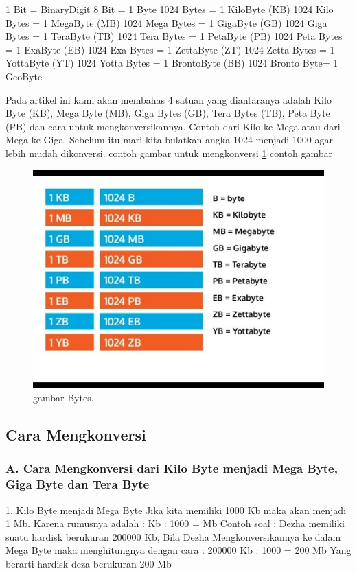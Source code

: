 1 Bit = BinaryDigit
8 Bit = 1 Byte
1024 Bytes = 1 KiloByte (KB)
1024 Kilo Bytes = 1 MegaByte (MB)
1024 Mega Bytes = 1 GigaByte (GB)
1024 Giga Bytes = 1 TeraByte (TB)
1024 Tera Bytes = 1 PetaByte (PB)
1024 Peta Bytes = 1 ExaByte (EB)
1024 Exa Bytes = 1 ZettaByte (ZT)
1024 Zetta Bytes = 1 YottaByte (YT)
1024 Yotta Bytes = 1 BrontoByte (BB)
1024 Bronto Byte= 1 GeoByte

Pada artikel ini kami akan membahas 4 satuan yang diantaranya adalah Kilo Byte (KB), Mega Byte (MB), Giga Bytes (GB), Tera Bytes (TB), Peta Byte (PB) dan cara untuk mengkonversikannya. Contoh dari Kilo ke Mega atau dari Mega ke Giga. 
Sebelum itu mari kita bulatkan angka 1024 menjadi 1000 agar lebih mudah dikonversi. \cite{menon1999nanotechnology}
contoh gambar untuk mengkonversi 
\ref{Bytes.JPG}
contoh gambar

\begin{figure}[ht]
\centerline{\includegraphics[width=1\textwidth]{figures/Bytes.JPG}}
\caption{gambar Bytes.}
\label{Bytes.JPG}
\end{figure}

\subsection {Cara Mengkonversi}
\subsubsection {A.	Cara Mengkonversi dari Kilo Byte menjadi Mega Byte, Giga Byte dan Tera Byte}

1.	Kilo Byte menjadi Mega Byte
Jika kita memiliki 1000 Kb maka akan menjadi 1 Mb. Karena rumusnya adalah :
Kb : 1000 = Mb
Contoh soal :
Dezha memiliki suatu hardisk berukuran 200000 Kb, Bila Dezha Mengkonversikannya ke dalam Mega Byte maka menghitungnya dengan cara :
200000 Kb : 1000 = 200 Mb
Yang berarti hardisk deza berukuran 200 Mb

